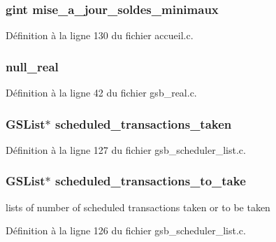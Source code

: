 \subsubsection[{mise\_\-a\_\-jour\_\-soldes\_\-minimaux}]{\setlength{\rightskip}{0pt plus 5cm}gint {\bf mise\_\-a\_\-jour\_\-soldes\_\-minimaux}}\label{accueil_8c_afaffaedc4fd0ae8638f7158c6777b35b}


Définition à la ligne 130 du fichier accueil.c.

\subsubsection[{null\_\-real}]{ {\bf null\_\-real}}\label{accueil_8c_a26f304bec3fdc0651b9aa8765d4de3c6}


Définition à la ligne 42 du fichier gsb\_\-real.c.

\subsubsection[{scheduled\_\-transactions\_\-taken}]{\setlength{\rightskip}{0pt plus 5cm}GSList$\ast$ {\bf scheduled\_\-transactions\_\-taken}}\label{accueil_8c_af539ba1ef9bfd1d56ab43b9865b0bab5}


Définition à la ligne 127 du fichier gsb\_\-scheduler\_\-list.c.

\subsubsection[{scheduled\_\-transactions\_\-to\_\-take}]{\setlength{\rightskip}{0pt plus 5cm}GSList$\ast$ {\bf scheduled\_\-transactions\_\-to\_\-take}}\label{accueil_8c_ade6e813638ccb1437faf234fa2725303}
lists of number of scheduled transactions taken or to be taken 

Définition à la ligne 126 du fichier gsb\_\-scheduler\_\-list.c.

